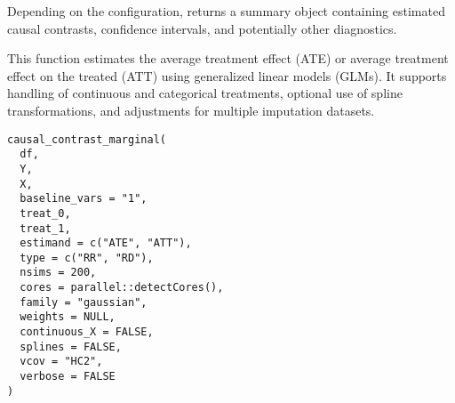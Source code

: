 \documentclass[a4paper]{book}
\begin{document}
%
\begin{Value}
Depending on the configuration, returns a summary object containing estimated causal contrasts, confidence intervals, and potentially other diagnostics.
\end{Value}
%
\begin{Description}
This function estimates the average treatment effect (ATE) or average treatment effect on the treated (ATT)
using generalized linear models (GLMs). It supports handling of continuous and categorical treatments, optional
use of spline transformations, and adjustments for multiple imputation datasets.
\end{Description}
%
\begin{Usage}
\begin{verbatim}
causal_contrast_marginal(
  df,
  Y,
  X,
  baseline_vars = "1",
  treat_0,
  treat_1,
  estimand = c("ATE", "ATT"),
  type = c("RR", "RD"),
  nsims = 200,
  cores = parallel::detectCores(),
  family = "gaussian",
  weights = NULL,
  continuous_X = FALSE,
  splines = FALSE,
  vcov = "HC2",
  verbose = FALSE
)
\end{verbatim}
\end{Usage}
%
\end{document}
